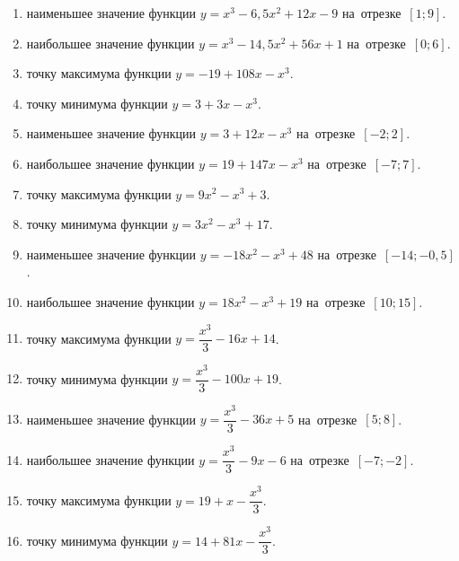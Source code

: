 \documentclass[a4paper,10pt]{article}
\begin{document}
\begin{enumerate}
\item {} наименьшее значение функции $y=x^3 -6,5x^2+12x-9$ на~отрезке~$\left[1;9\right]$.

\item {} наибольшее значение функции $y=x^3 -14,5x^2+56x+1$ на~отрезке~$\left[0;6\right]$.

\item {} точку максимума функции $y=-19+108x-x^3$.

\item {} точку минимума функции $y=3+3x-x^3$.

\item {} наименьшее значение функции $y=3+12x-x^3$ на~отрезке~$\left[-2;2\right]$.

\item {} наибольшее значение функции $y=19+147x-x^3$ на~отрезке~$\left[-7;7\right]$.

\item {} точку максимума функции $y=9x^2-x^3+3$.

\item {} точку минимума функции $y=3x^2-x^3+17$.

\item {} наименьшее значение функции $y=-18x^2-x^3+48$ на~отрезке~$\left[-14;-0,5\right]$.

\item {} наибольшее значение функции $y=18x^2-x^3+19$ на~отрезке~$\left[10;15\right]$.

\item {} точку максимума функции $y=\dfrac{x^3}{3} -16x+14$.

\item {} точку минимума функции $y=\dfrac{x^3}{3} -100x+19$.

\item {} наименьшее значение функции $y=\dfrac{x^3}{3} -36x+5$ на~отрезке~$\left[5;8\right]$.

\item {} наибольшее значение функции $y=\dfrac{x^3}{3} -9x-6$ на~отрезке~$\left[-7;-2\right]$.

\item {} точку максимума функции $y=19 +x-\dfrac{x^3}{3}$.

\item {} точку минимума функции $y=14 +81x-\dfrac{x^3}{3}$.


\end{enumerate}
\end{document}
